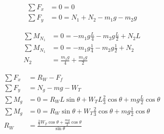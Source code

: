 \begin{problem}
    \[
    \begin{aligned}
        \sum F_x &= 0 = 0\\
        \sum F_y &= 0 = N_1+N_2-m_1g-m_2g    
    \end{aligned}
    \]

    \[
        \begin{aligned}
            \sum M_{N_1} &= 0 = -m_1g\frac{L}{4} - m_2g\frac{L}{2} + N_2L\\
            \sum M_{N_1} &= 0 = -m_1g\frac{1}{4} - m_2g\frac{1}{2} + N_2\\
            N_2 &= \frac{m_1g}{4} + \frac{m_2g}{2}
        \end{aligned}
    \]
\end{problem}


\begin{problem}
    \[
    \begin{aligned}
        \sum F_x &= R_W  -F_f\\
        \sum F_y &= N_g - mg - W_T\\
        \sum M_g &= 0 = R_WL\sin\theta + W_TL \frac{2}{3} \cos\theta + mg \frac{L}{2} \cos\theta\\
        \sum M_g &= 0 = R_W\sin\theta + W_T \frac{2}{3} \cos\theta + mg \frac{1}{2} \cos\theta\\
        R_W &= \frac{\frac{2}{3}W_T\cos\theta + \frac{mg}{2}\cos\theta}{\sin\theta}
    \end{aligned}    
    \]
\end{problem}